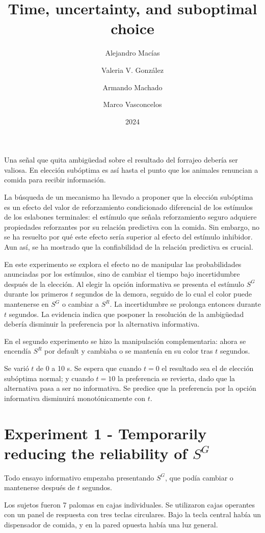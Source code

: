 \documentclass[a4paper,12pt]{article}
\title{Time, uncertainty, and suboptimal choice}
\author{Alejandro Macías \and Valeria V.
González \and Armando Machado \and Marco Vasconcelos}
\date{2024}
\begin{document}
{\scshape\bfseries \maketitle}

Una señal que quita ambigüedad sobre el resultado del forrajeo debería ser valiosa.
En elección subóptima es así hasta el punto que los animales renuncian a comida para recibir información.

La búsqueda de un mecanismo ha llevado a proponer que la elección subóptima es un efecto del valor de reforzamiento condicionado diferencial de los estímulos de los eslabones terminales: el estímulo que señala reforzamiento seguro adquiere propiedades reforzantes por su relación predictiva con la comida.
Sin embargo, no se ha resuelto por qué este efecto sería superior al efecto del estímulo inhibidor.
Aun así, se ha mostrado que la confiabilidad de la relación predictiva es crucial.

En este experimento se explora el efecto no de manipular las probabilidades anunciadas por los estímulos, sino de cambiar el tiempo bajo incertidumbre después de la elección.
Al elegir la opción informativa se presenta el estímulo $S^{G}$ durante los primeros $t$ segundos de la demora, seguido de lo cual el color puede mantenerse en $S^{G}$ o cambiar a $S^{R}$.
La incertidumbre se prolonga entonces durante $t$ segundos.
La evidencia indica que posponer la resolución de la ambigüedad debería disminuir la preferencia por la alternativa informativa.

En el segundo experimento se hizo la manipulación complementaria: ahora se encendía $S^{R}$ por default y cambiaba o se mantenía en su color tras $t$ segundos.

Se varió $t$ de 0 a 10 s.
Se espera que cuando $t = 0$ el resultado sea el de elección subóptima normal; y cuando $t = 10$ la preferencia se revierta, dado que la alternativa pasa a ser no informativa.
Se predice que la preferencia por la opción informativa disminuirá monotónicamente con $t$.

\section{Experiment 1 - Temporarily reducing the reliability of $S^{G}$}

Todo ensayo informativo empezaba presentando $S^{G}$, que podía cambiar o mantenerse después de $t$ segundos.

Los sujetos fueron 7 palomas en cajas individuales.
Se utilizaron cajas operantes con un panel de respuesta con tres teclas circulares.
Bajo la tecla central había un dispensador de comida, y en la pared opuesta había una luz general.
\end{document}
